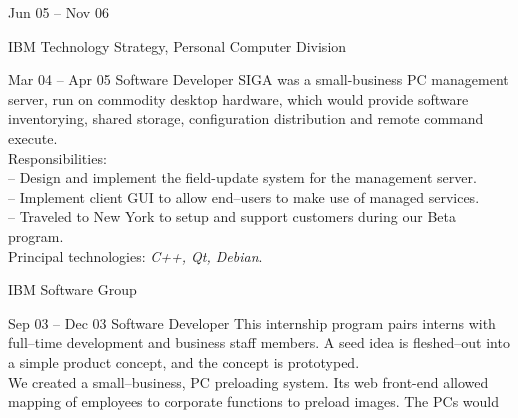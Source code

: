 \documentclass[letterpaper, 11pt]{article}
\begin{document}
\begin{resume}
\begin{block}
\begin{subcategory}{Jun 05 -- Nov 06}
                \bigskip
                \bigskip
            \end{subcategory}
        \end{block}
        \begin{block}
            \begin{category}{IBM}
                 {Technology Strategy, Personal Computer Division}
                \smallskip
            \end{category}
            \begin{subcategory}{Mar 04 -- Apr 05}
                 {Software Developer}
                SIGA was a small-business PC management server, run on commodity desktop
                hardware, which would provide software inventorying, shared storage,
                configuration distribution and remote command execute.
                \\[1ex]
                Responsibilities: \\
                -- Design and implement the field-update system for the management server. \\
                -- Implement client GUI to allow end--users to make use of managed services. \\
                -- Traveled to New York to setup and support customers during our Beta program.
                \\[1ex]
                Principal technologies: \emph{C++, Qt, Debian}.
                \bigskip
                \bigskip
            \end{subcategory}
        \end{block}
        \begin{block}
            \begin{category}{IBM}
                 {Software Group}
                \smallskip
            \end{category}
            \begin{subcategory}{Sep 03 -- Dec 03}
                 {Software Developer}
                This internship program pairs interns with full--time development and
                business staff members.  A seed idea is fleshed--out into a simple
                product concept, and the concept is prototyped.
                \\[1ex]
                We created a small--business, PC preloading system.  Its web front-end allowed
                mapping of employees to corporate functions to preload images.  The PCs would

\end{subcategory}
\end{block}
\end{resume}
\end{document}
